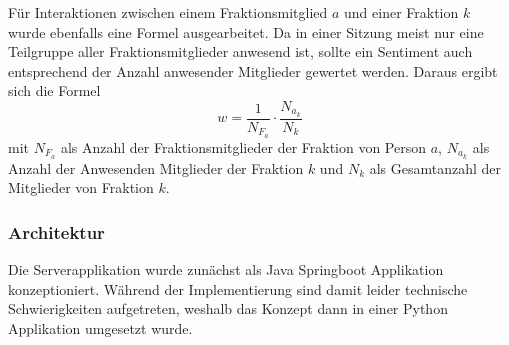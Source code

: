 Für Interaktionen zwischen einem Fraktionsmitglied $a$ und einer Fraktion $k$ wurde ebenfalls eine Formel ausgearbeitet. Da in einer Sitzung meist nur eine Teilgruppe aller Fraktionsmitglieder anwesend ist, sollte ein Sentiment auch entsprechend der Anzahl anwesender Mitglieder gewertet werden. Daraus ergibt sich die Formel
$$w=\frac{1}{N_{F_a}} \cdot \frac{N_{a_k}}{N_{k}}$$ mit $N_{F_a}$ als Anzahl der Fraktionsmitglieder der Fraktion von Person $a$, $N_{a_k}$ als Anzahl der Anwesenden Mitglieder der Fraktion $k$ und $N_{k}$ als Gesamtanzahl der Mitglieder von Fraktion $k$. 

\subsubsection{Architektur}
Die Serverapplikation wurde zunächst als Java Springboot Applikation konzeptioniert. Während der Implementierung sind damit leider technische Schwierigkeiten aufgetreten, weshalb das Konzept dann in einer Python Applikation umgesetzt wurde.


